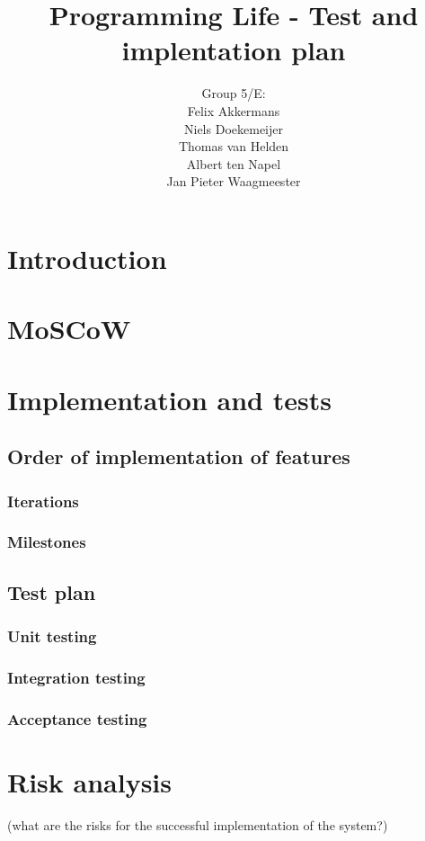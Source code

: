 \documentclass[a4paper]{article}
\title{Programming Life - Test and implentation plan }
\author{Group 5/E:\\
Felix Akkermans \\
Niels Doekemeijer \\
Thomas van Helden \\
Albert ten Napel \\
Jan Pieter Waagmeester}
\begin{document}
\maketitle

\vfill

\small{\tableofcontents}
\pagebreak
\section{Introduction}

\section{MoSCoW}
\section{Implementation and tests}

\subsection{Order of implementation of features}

\subsubsection{Iterations}

\subsubsection{Milestones}

\subsection{Test plan}

\subsubsection{Unit testing}

\subsubsection{Integration testing}

\subsubsection{Acceptance testing}

\section{Risk analysis}
(what are the risks for the successful implementation of the system?)
\end{document}
